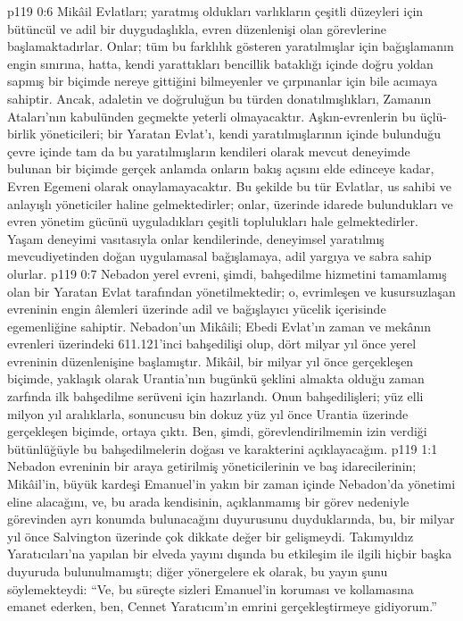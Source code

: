 \vs p119 0:6 Mikâil Evlatları; yaratmış oldukları varlıkların çeşitli düzeyleri için bütüncül ve adil bir duygudaşlıkla, evren düzenlenişi olan görevlerine başlamaktadırlar. Onlar; tüm bu farklılık gösteren yaratılmışlar için bağışlamanın engin sınırına, hatta, kendi yarattıkları bencillik bataklığı içinde doğru yoldan sapmış bir biçimde nereye gittiğini bilmeyenler ve çırpınanlar için bile acımaya sahiptir. Ancak, adaletin ve doğruluğun bu türden donatılmışlıkları, Zamanın Ataları’nın kabulünden geçmekte yeterli olmayacaktır. Aşkın\hyp{}evrenlerin bu üçlü\hyp{}birlik yöneticileri; bir Yaratan Evlat’ı, kendi yaratılmışlarının içinde bulunduğu çevre içinde tam da bu yaratılmışların kendileri olarak mevcut deneyimde bulunan bir biçimde gerçek anlamda onların bakış açısını elde edinceye kadar, Evren Egemeni olarak onaylamayacaktır. Bu şekilde bu tür Evlatlar, us sahibi ve anlayışlı yöneticiler haline gelmektedirler; onlar, üzerinde idarede bulundukları ve evren yönetim gücünü uyguladıkları çeşitli toplulukları  hale gelmektedirler. Yaşam deneyimi vasıtasıyla onlar kendilerinde, deneyimsel yaratılmış mevcudiyetinden doğan uygulamasal bağışlamaya, adil yargıya ve sabra sahip olurlar.
\vs p119 0:7 Nebadon yerel evreni, şimdi, bahşedilme hizmetini tamamlamış olan bir Yaratan Evlat tarafından yönetilmektedir; o, evrimleşen ve kusursuzlaşan evreninin engin âlemleri üzerinde adil ve bağışlayıcı yücelik içerisinde egemenliğine sahiptir. Nebadon’un Mikâili; Ebedi Evlat’ın zaman ve mekânın evrenleri üzerindeki 611.121’inci bahşedilişi olup, dört milyar yıl önce yerel evreninin düzenlenişine başlamıştır. Mikâil, bir milyar yıl önce gerçekleşen biçimde, yaklaşık olarak Urantia’nın bugünkü şeklini almakta olduğu zaman zarfında ilk bahşedilme serüveni için hazırlandı. Onun bahşedilişleri; yüz elli milyon yıl aralıklarla, sonuncusu bin dokuz yüz yıl önce Urantia üzerinde gerçekleşen biçimde, ortaya çıktı. Ben, şimdi, görevlendirilmemin izin verdiği bütünlüğüyle bu bahşedilmelerin doğası ve karakterini açıklayacağım.
\vs p119 1:1 Nebadon evreninin bir araya getirilmiş yöneticilerinin ve baş idarecilerinin; Mikâil’in, büyük kardeşi Emanuel’in yakın bir zaman içinde Nebadon’da yönetimi eline alacağını, ve, bu arada kendisinin, açıklanmamış bir görev nedeniyle görevinden ayrı konumda bulunacağını duyurusunu duyduklarında, bu, bir milyar yıl önce Salvington üzerinde çok dikkate değer bir gelişmeydi. Takımyıldız Yaratıcıları’na yapılan bir elveda yayını dışında bu etkileşim ile ilgili hiçbir başka duyuruda bulunulmamıştı; diğer yönergelere ek olarak, bu yayın şunu söylemekteydi: “Ve, bu süreçte sizleri Emanuel’in koruması ve kollamasına emanet ederken, ben, Cennet Yaratıcım’ın emrini gerçekleştirmeye gidiyorum.”
